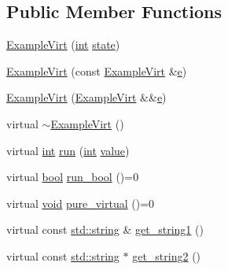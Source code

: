 \subsection*{Public Member Functions}
\begin{DoxyCompactItemize}
\item 
\mbox{\hyperlink{class_example_virt_a02866289b18033e7a1700e7221244444}{Example\+Virt}} (\mbox{\hyperlink{warnings_8h_a74f207b5aa4ba51c3a2ad59b219a423b}{int}} \mbox{\hyperlink{structstate}{state}})
\item 
\mbox{\hyperlink{class_example_virt_a20bcbf22449c50dbdfbae60cc10de0d0}{Example\+Virt}} (const \mbox{\hyperlink{class_example_virt}{Example\+Virt}} \&\mbox{\hyperlink{longobject_8h_a28cf183ea1588229c01af441267bc98c}{e}})
\item 
\mbox{\hyperlink{class_example_virt_acba8838f96d22af58fcc895fdcb646a4}{Example\+Virt}} (\mbox{\hyperlink{class_example_virt}{Example\+Virt}} \&\&\mbox{\hyperlink{longobject_8h_a28cf183ea1588229c01af441267bc98c}{e}})
\item 
virtual \mbox{\hyperlink{class_example_virt_aae209e4a0a7f230d16ae3912b19a1b39}{$\sim$\+Example\+Virt}} ()
\item 
virtual \mbox{\hyperlink{warnings_8h_a74f207b5aa4ba51c3a2ad59b219a423b}{int}} \mbox{\hyperlink{class_example_virt_a912c8aeca102f6654bfd3746c7b90fd9}{run}} (\mbox{\hyperlink{warnings_8h_a74f207b5aa4ba51c3a2ad59b219a423b}{int}} \mbox{\hyperlink{_s_d_l__opengl__glext_8h_a8ad81492d410ff2ac11f754f4042150f}{value}})
\item 
virtual \mbox{\hyperlink{asdl_8h_af6a258d8f3ee5206d682d799316314b1}{bool}} \mbox{\hyperlink{class_example_virt_a9c70a3e16f56f6bafe352415cec884ff}{run\+\_\+bool}} ()=0
\item 
virtual \mbox{\hyperlink{_s_d_l__opengles2__gl2ext_8h_ae5d8fa23ad07c48bb609509eae494c95}{void}} \mbox{\hyperlink{class_example_virt_a515529fab251071921dc865f2075f920}{pure\+\_\+virtual}} ()=0
\item 
virtual const \mbox{\hyperlink{_s_d_l__opengl__glext_8h_ab4ccfaa8ab0e1afaae94dc96ef52dde1}{std\+::string}} \& \mbox{\hyperlink{class_example_virt_ab4f4498d072b7ca85eae10d0b504e8a0}{get\+\_\+string1}} ()
\item 
virtual const \mbox{\hyperlink{_s_d_l__opengl__glext_8h_ab4ccfaa8ab0e1afaae94dc96ef52dde1}{std\+::string}} $\ast$ \mbox{\hyperlink{class_example_virt_a21e6415d476fba511303b5dc897dfc83}{get\+\_\+string2}} ()
\end{DoxyCompactItemize}


